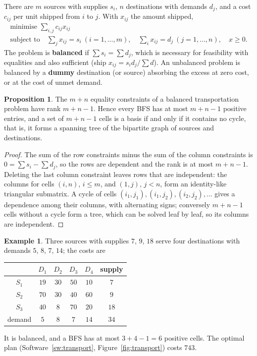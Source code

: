 \documentclass[11pt,a4paper]{article}
\numberwithin{equation}{section}
\theoremstyle{definition}
\newtheorem{exa}[thm]{Example}
\newtheorem{prop}[thm]{Proposition}
\begin{document}
There are $m$ sources with supplies $s_i$, $n$ destinations with demands $d_j$, and a cost $c_{ij}$ per unit shipped from $i$ to $j$. With $x_{ij}$ the amount shipped,
\begin{gather*}
\text{minimise } \sum_{i,j}c_{ij}x_{ij} \\
\text{subject to}\quad \sum_jx_{ij} = s_i \ (i = 1, \ldots, m), \quad \sum_ix_{ij} = d_j \ (j = 1, \ldots, n), \quad x \geq 0 .
\end{gather*}
The problem is \textbf{balanced} if $\sum s_i = \sum d_j$, which is necessary for feasibility with equalities and also sufficient (ship $x_{ij} = s_id_j/\sum d$). An unbalanced problem is balanced by a \textbf{dummy} destination (or source) absorbing the excess at zero cost, or at the cost of unmet demand.

\begin{prop}
\label{prop:transportrank}
The $m + n$ equality constraints of a balanced transportation problem have rank $m + n - 1$. Hence every BFS has at most $m + n - 1$ positive entries, and a set of $m + n - 1$ cells is a basis if and only if it contains no cycle, that is, it forms a spanning tree of the bipartite graph of sources and destinations.
\end{prop}

\begin{proof}
The sum of the row constraints minus the sum of the column constraints is $0 = \sum s_i - \sum d_j$, so the rows are dependent and the rank is at most $m + n - 1$. Deleting the last column constraint leaves rows that are independent: the columns for cells $(i, n)$, $i \leq m$, and $(1, j)$, $j < n$, form an identity-like
triangular submatrix. A cycle of cells $(i_1, j_1), (i_1, j_2), (i_2, j_2), \ldots$ gives a dependence among their columns, with alternating signs; conversely $m + n - 1$ cells without a cycle form a tree, which can be solved leaf by leaf, so its columns are independent.
\end{proof}

\begin{exa}
\label{ex:transport}
Three sources with supplies $7$, $9$, $18$ serve four destinations with demands $5$, $8$, $7$, $14$; the costs are
\begin{center}
\small
\begin{tabular}{c|cccc|c}
 & $D_1$ & $D_2$ & $D_3$ & $D_4$ & supply \\
\hline
$S_1$ & $19$ & $30$ & $50$ & $10$ & $7$ \\
$S_2$ & $70$ & $30$ & $40$ & $60$ & $9$ \\
$S_3$ & $40$ & $8$ & $70$ & $20$ & $18$ \\
\hline
demand & $5$ & $8$ & $7$ & $14$ & $34$
\end{tabular}
\end{center}
It is balanced, and a BFS has at most $3 + 4 - 1 = 6$ positive cells. The optimal plan (Software~\ref{sw:transport}, Figure~\ref{fig:transport}) costs $743$.
\end{exa}
\end{document}
